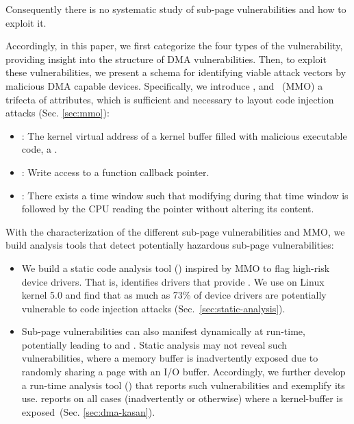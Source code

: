 Consequently there is no systematic study of sub-page vulnerabilities and how to exploit it.

Accordingly, in this paper, we first categorize the four types of the \subpage{} vulnerability, providing insight into the structure of DMA vulnerabilities.
Then, to exploit these vulnerabilities, we present a schema for identifying viable attack vectors by malicious DMA capable devices. Specifically, we introduce \motivation{}, \means and \oportunity~(MMO) a trifecta of attributes, which is sufficient and necessary to layout code injection attacks (Sec. \ref{sec:mmo}):

\begin{itemize}
    \item \motivation: The kernel virtual address of a kernel buffer filled with malicious executable code, a \mabaf.
    \item \means: Write access to a function callback pointer.
    \item \oportunity: There exists a time window such that modifying \means during that time window is followed by the CPU reading the pointer without altering its content. 
\end{itemize} 



With the characterization of the different sub-page vulnerabilities and MMO, we build analysis tools that detect potentially hazardous sub-page vulnerabilities:

\begin{itemize}
    \item We build a static code analysis tool (\tool) inspired by MMO to flag high-risk device drivers. That is, \tool identifies drivers that provide \means.
We use \tool on Linux kernel 5.0 and find that as much as 73\% of device drivers are potentially vulnerable to code injection attacks (Sec.~\ref{sec:static-analysis}). 

    \item Sub-page vulnerabilities can also manifest dynamically at run-time, potentially leading to \means and \oportunity. 
Static analysis may not reveal such vulnerabilities, where a memory buffer is inadvertently exposed due to randomly sharing a page with an I/O buffer. Accordingly, we further develop a run-time analysis tool (\dkasan) that reports such vulnerabilities and exemplify its use. \dkasan reports on all cases (inadvertently or otherwise) where a kernel-buffer is exposed~(Sec. \ref{sec:dma-kasan}).
\end{itemize}


